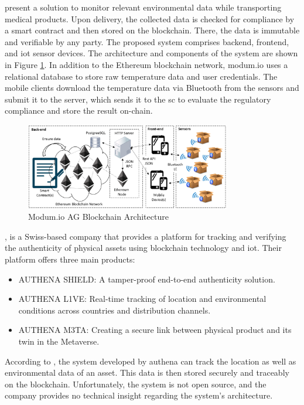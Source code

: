 \textcite{modum.io} present a solution to monitor relevant environmental data while transporting medical products. Upon delivery, the collected data is checked for compliance by a smart contract and then stored on the blockchain. There, the data is immutable and verifiable by any party. The proposed system comprises backend, frontend, and \gls{iot} sensor devices. The architecture and components of the system are shown in Figure \ref{fig:modum.io}. In addition to the Ethereum blockchain network, modum.io uses a relational database to store raw temperature data and user credentials. The mobile clients download the temperature data via Bluetooth from the sensors and submit it to the server, which sends it to the \gls{sc} to evaluate the regulatory compliance and store the result on-chain.

\begin{figure}[ht]
    \centering
    \includegraphics[width=0.8\textwidth]{diagrams/modum_architecutre.png}
    \caption{Modum.io AG Blockchain Architecture \cite{modum.io}}
    \label{fig:modum.io}
\end{figure}

\textcite{authena}, is a Swiss-based company that provides a platform for tracking and verifying the authenticity of physical assets using blockchain technology and \gls{iot}. Their platform offers three main products:
\begin{itemize}
    \item AUTHENA SHIELD: A tamper-proof end-to-end authenticity solution.
    \item AUTHENA L1VE: Real-time tracking of location and environmental conditions across countries and distribution channels.
    \item AUTHENA M3TA: Creating a secure link between physical product and its twin in the Metaverse.
\end{itemize}
According to \cite{authenahandelszeitung}, the system developed by authena can track the location as well as environmental data of an asset. This data is then stored securely and traceably on the blockchain. Unfortunately, the system is not open source, and the company provides no technical insight regarding the system's architecture.

